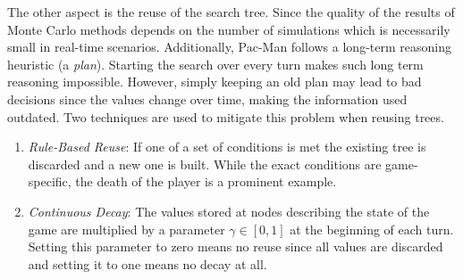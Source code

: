 The other aspect is the reuse of the search tree. Since the quality of the results of Monte Carlo methods depends on the number of simulations which is necessarily small in real-time scenarios. Additionally, Pac-Man follows a long-term reasoning heuristic (a \textit{plan}). Starting the search over every turn makes such long term reasoning impossible. However, simply keeping an old plan may lead to bad decisions since the values change over time, making the information used outdated. Two techniques are used to mitigate this problem when reusing trees.

\begin{enumerate}[label=\arabic*)]
    \item \textit{Rule-Based Reuse}: If one of a set of conditions is met the existing tree is discarded and a new one is built. While the exact conditions are game-specific, the death of the player is a prominent example.
    \item \textit{Continuous Decay}: The values stored at nodes describing the state of the game are multiplied by a parameter $\gamma \in [0,1]$ at the beginning of each turn. Setting this parameter to zero means no reuse since all values are discarded and setting it to one means no decay at all.
\end{enumerate}

